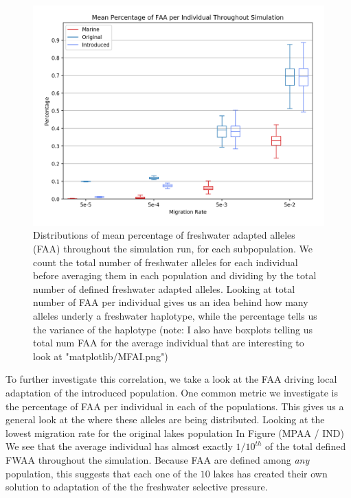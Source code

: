 \documentclass{article}
\begin{document}
\begin{figure}[h!tb]
	\begin{center}
  		\includegraphics[width=0.8\linewidth]{matplotlib/MPFAI.png}
  		\caption{Distributions of mean percentage of freshwater adapted alleles (FAA) throughout the simulation run, for each subpopulation.
		We count the total number of freshwater alleles for each individual before averaging them in each population and dividing by the total number of defined
		freshwater adapted alleles.
		Looking at total number of FAA per individual gives us an idea behind how many alleles underly a freshwater haplotype, 
		while the percentage tells us the variance of the haplotype (note: I also have boxplots telling us total num FAA for the average individual that are interesting to look at "matplotlib/MFAI.png")}
  		\label{fig:MPFAI}
	\end{center}
\end{figure}



To further investigate this correlation, we take a look at the FAA driving 
local adaptation of the introduced population. 
One common metric we investigate is the percentage of FAA per individual in each of the populations. 
This gives us a general look at the where these alleles are being distributed. 
Looking at the lowest migration rate for the original lakes population In Figure (MPAA / IND) 
We see that the average individual has almost exactly $1/10^{th}$ of the total defined FWAA throughout the simulation. 
Because FAA are defined among \textit{any} population, this suggests that each one of the $10$ 
lakes has created their own solution to adaptation of the the freshwater selective pressure. 
\end{document}

